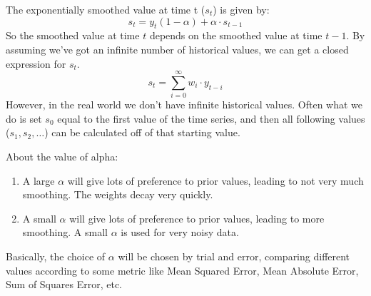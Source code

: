     The exponentially smoothed value at time t ($s_t$) is given by:
    \[
        s_t = y_t(1 - \alpha) + \alpha \cdot s_{t-1}
    \]
    So the smoothed value at time $t$ depends on the smoothed value at time
    $t-1$. By assuming we've got an infinite number of historical values, we
    can get a closed expression for $s_t$.
    \[
    s_t = \sum_{i=0}^\infty w_i \cdot y_{t-i}
\]
    However, in the real world we don't have infinite historical values. Often
    what we do is set $s_0$ equal to the first value of the time series, and
    then all following values ($s_1, s_2, \dots$) can be calculated off of that
    starting value.

    About the value of alpha:
    \begin{enumerate}
        \item A large $\alpha$ will give lots of preference to prior values,
            leading to not very much smoothing. The weights decay very quickly.
        \item A small $\alpha$ will give lots of preference to prior values,
            leading to more smoothing. A small $\alpha$ is used for very noisy
            data.
    \end{enumerate}
    
    Basically, the choice of $\alpha$ will be chosen by trial and error,
    comparing different values according to some metric like Mean Squared
    Error, Mean Absolute Error, Sum of Squares Error, etc.


